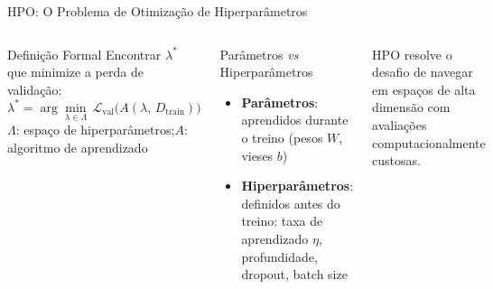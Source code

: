 \documentclass[aspectratio=169]{beamer}
\begin{document}
\begin{frame}{HPO: O Problema de Otimização de Hiperparâmetros}
    \begin{columns}
        \begin{block}{Definição Formal}
            \footnotesize
            Encontrar $\lambda^*$ que minimize a perda de validação:
            \[
            \lambda^* = \arg\min_{\lambda \in \Lambda}\,
            \mathcal{L}_{\mathrm{val}}\!\bigl(A(\lambda,\, D_{\mathrm{train}})\bigr)
            \]
            $\Lambda$: espaço de hiperparâmetros;\quad $A$: algoritmo de aprendizado
        \end{block}
        \begin{block}{Parâmetros \textit{vs} Hiperparâmetros}
            \begin{itemize}\footnotesize
                \item \textbf{Parâmetros}: aprendidos durante o treino (pesos $W$, vieses $b$)
                \item \textbf{Hiperparâmetros}: definidos antes do treino:
                      taxa de aprendizado $\eta$, profundidade, dropout, batch size
            \end{itemize}
        \end{block}
        \begin{alertblock}{}\footnotesize
            HPO resolve o desafio de navegar em espaços de alta dimensão com avaliações computacionalmente custosas.
        \end{alertblock}
        \centering
    \end{columns}
\end{frame}
\end{document}

